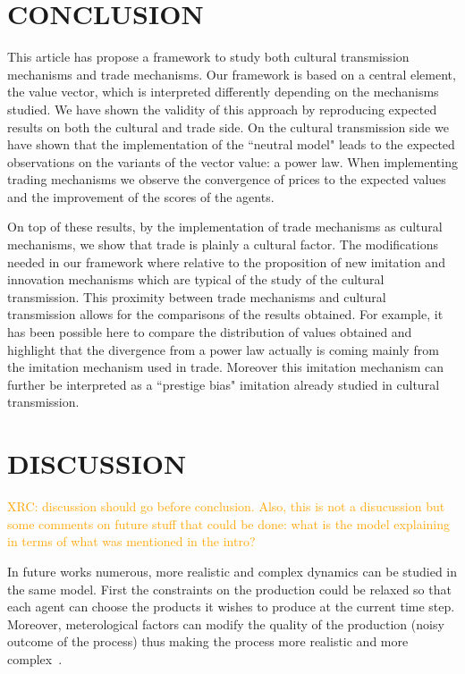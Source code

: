 \documentclass{wscpaperproc}
\newcommand{\memo}[2]{\textcolor{#1}{#2}}
\newcommand{\xrc}[1]{\memo{orange}{XRC: #1\\}}
\begin{document}
\section{CONCLUSION}

This article has propose a framework to study both cultural transmission mechanisms and trade mechanisms. Our framework is based on a central element, the value vector, which is interpreted differently depending on the mechanisms studied. We have shown the validity of this approach by reproducing expected results on both the cultural and trade side. On the cultural transmission side we have shown that the implementation of the ``neutral model" leads to the expected observations on the variants of the vector value: a power law. When implementing trading mechanisms we observe the convergence of prices to the expected values and the improvement of the scores of the agents.

On top of these results, by the implementation of trade mechanisms as cultural mechanisms, we show that trade is plainly a cultural factor. The modifications needed in our framework where relative to the proposition of new imitation and innovation mechanisms which are typical of the study of the cultural transmission. This proximity between trade mechanisms and cultural transmission allows for the comparisons of the results obtained. For example, it has been possible here to compare the distribution of values obtained and highlight that the divergence from a power law actually is coming mainly from the imitation mechanism used in trade. Moreover this imitation mechanism can further be interpreted as a ``prestige bias" imitation already studied in cultural transmission.

\section{DISCUSSION}


\xrc{discussion should go before conclusion. Also, this is not a disucussion but some comments on future stuff that could be done: what is the model explaining in terms of what was mentioned in the intro?}

In future works numerous, more realistic and complex dynamics can be studied in the same model. First the constraints on the production could be relaxed so that each agent can choose the products it wishes to produce at the current time step. Moreover, meterological factors can modify the quality of the production (noisy outcome of the process) thus making the process more realistic and more complex~\cite{bentley_specialisation_2005}.
\end{document}
